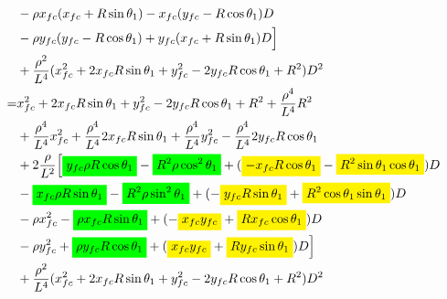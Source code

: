 \documentclass[12pt]{article}
\newcommand{\mathcolorbox}[2]{\colorbox{#1}{$\displaystyle #2$}}
\begin{document}
\begin{align}
    &-\rho x_{fc}(x_{fc} + R\sin\theta_1) - x_{fc}(y_{fc}-R\cos\theta_1)D \nonumber\\
    &-\rho y_{fc}(y_{fc}-R\cos\theta_1) + y_{fc}(x_{fc} + R\sin\theta_1)D\Bigr] \nonumber\\
    &+\frac{\rho^2}{L^4}(x_{fc}^2 + 2x_{fc}R\sin\theta_1 + y_{fc}^2 -2y_{fc}R\cos\theta_1 +  R^2 )D^2\\
    =& x_{fc}^2 +2x_{fc}R\sin\theta_1 + y_{fc}^2 -2y_{fc}R\cos\theta_1 + R^2 + \frac{\rho^4}{L^4}R^2 \nonumber\\
    &+   \frac{\rho^4}{L^4}x_{fc}^2 + \frac{\rho^4}{L^4}2x_{fc}R\sin\theta_1 + \frac{\rho^4}{L^4}y_{fc}^2 -\frac{\rho^4}{L^4}2y_{fc}R\cos\theta_1 \nonumber\\
    &+ 2\frac{\rho}{L^2}\Bigl[ \mathcolorbox{green}{y_{fc}\rho R\cos\theta_1} -\mathcolorbox{green}{R^2\rho \cos^2\theta_1} + ( \mathcolorbox{yellow}{ -x_{fc}R\cos\theta_1} - \mathcolorbox{yellow}{ R^2\sin\theta_1\cos\theta_1 } )D \nonumber\\
    &- \mathcolorbox{green}{ x_{fc}\rho R\sin\theta_1 } - \mathcolorbox{green}{R^2\rho \sin^2\theta_1} + (- \mathcolorbox{yellow}{ y_{fc}R\sin\theta_1 } + \mathcolorbox{yellow}{ R^2\cos\theta_1\sin\theta_1 } )D \nonumber\\
    &-\rho x_{fc}^2 - \mathcolorbox{green}{ \rho x_{fc}R\sin\theta_1 } + (- \mathcolorbox{yellow}{x_{fc}y_{fc} } + \mathcolorbox{yellow}{ Rx_{fc}\cos\theta_1 } )D \nonumber\\
    &-\rho y_{fc}^2 +\mathcolorbox{green}{ \rho y_{fc}R\cos\theta_1 } + ( \mathcolorbox{yellow}{ x_{fc}y_{fc} } + \mathcolorbox{yellow}{ Ry_{fc}\sin\theta_1 } )D\Bigr] \nonumber\\
    &+\frac{\rho^2}{L^4}(x_{fc}^2 + 2x_{fc}R\sin\theta_1 + y_{fc}^2 -2y_{fc}R\cos\theta_1 +  R^2 )D^2
\end{align}
\end{document}
